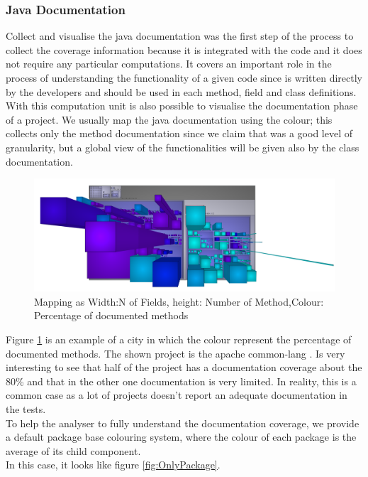 \documentclass[]{usiinfbachelorproject}
\begin{document}
\subsubsection{Java Documentation}
Collect and visualise the java documentation was the first step of the process to collect the coverage information because it is integrated with the code and it does not require any particular computations. It covers an important role in the process of understanding the functionality of a given code since is written directly by the developers and should be used in each method, field and class definitions.\\
With this computation unit is also possible to visualise the documentation phase of a project. We usually map the java documentation using the colour; this collects only the method documentation since we claim that was a good level of granularity, but a global view of the functionalities will be given also by the class documentation.


\begin{figure}[H]
	\centering
	\includegraphics[width=1\textwidth]{images/javaDoc}
	
	\caption[Java Documentation Mapping]{Mapping as Width:N of Fields, height: Number of Method,Colour: Percentage of documented methods\label{fig:javaDoc}}

\end{figure}

Figure \ref{fig:javaDoc} is an example of a city in which the colour represent the percentage of documented methods. The shown project is the apache common-lang . Is very interesting to see that half of the project has a documentation coverage about the 80\% and that in the other one documentation is very limited. In reality, this is a common case as a lot of projects doesn't report an adequate documentation in the tests.\\
To help the analyser to fully understand the documentation coverage, we provide a default package base colouring system, where the colour of each package is the average of its child component. \\
In this case, it looks like figure \ref{fig:OnlyPackage}.
\end{document}
